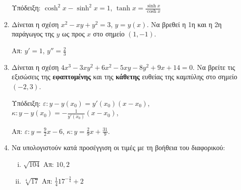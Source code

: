 \begin{enumerate}
    \textcolor{Col1}{Υπόδειξη:} 
      $ \cosh^{2}{x} - \sinh^{2}{x} = 1 $, \;
      $ \tanh{x} = \frac{\sinh{x}}{\cosh{x}} $ 
    \begin{enumerate}[(i)]
    \end{enumerate}

  \item Δίνεται η σχέση $ x^{2} - xy + y^{2} = 3 $, $ y=y(x) $. Να βρεθεί η 1η
    και η 2η παράγωγος της $y$ ως προς $x$ στο σημείο $ (1,-1) $.

    \hfill Απ: $ y' = 1$, $ y'' = \frac{2}{3} $

  \item Δίνεται η σχέση $ 4x^{3} - 3xy^{2} + 6x^{2} - 5xy - 8 y^{2} + 9x + 14
    = 0$. Να βρείτε τις εξισώσεις της \textbf{εφαπτομένης} και της \textbf{κάθετης} 
    ευθείας της καμπύλης στο σημείο $ (-2,3) $.

    \textcolor{Col1}{Υπόδειξη:} 
      $ \varepsilon: y-y(x_{0}) = y'(x_{0})(x- x_{0}) $, \;
      $ \kappa: y-y(x_{0}) = -\frac{1}{y'(x_{0})}(x- x_{0}) $, \;

    \hfill Απ: $\varepsilon\colon y = \frac{9}{2} x - 6 $, 
    $\kappa\colon y = \frac{2}{9} x + \frac{31}{9} $.

  \item Να υπολογιστούν κατά προσέγγιση οι τιμές με τη βοήθεια του διαφορικού:
    \begin{enumerate}[i)]
      \item $\sqrt{104}$ \hfill Απ: $10,2$
      \item $\sqrt[4]{17}$ \hfill Απ: $\frac{1}{4}17^{-\frac{3}{4}}+2$
    \end{enumerate}


\end{enumerate}

